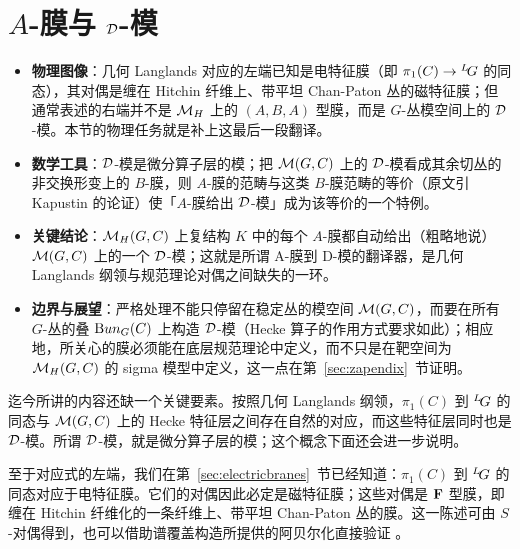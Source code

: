 
\section{$A$-膜与 ${\cal D}$-模}
\label{sec:abranes}

\begin{keytakeaways}
  \begin{itemize}[leftmargin=1.4em,itemsep=2pt,topsep=2pt]
    \item \textbf{物理图像}：几何 Langlands 对应的左端已知是电特征膜（即 $\pi_1(C)\to{}^L\negthinspace G$ 的同态），其对偶是缠在 Hitchin 纤维上、带平坦 Chan-Paton 丛的磁特征膜；但通常表述的右端并不是 $\MH$ 上的 $(A,B,A)$ 型膜，而是 $G$-丛模空间上的 ${\cal D}$-模。本节的物理任务就是补上这最后一段翻译。
    \item \textbf{数学工具}：${\cal D}$-模是微分算子层的模；把 $\M(G,C)$ 上的 ${\cal D}$-模看成其余切丛的非交换形变上的 $B$-膜，则 $A$-膜的范畴与这类 $B$-膜范畴的等价（原文引 Kapustin 的论证）使「$A$-膜给出 ${\cal D}$-模」成为该等价的一个特例。
    \item \textbf{关键结论}：$\MH(G,C)$ 上复结构 $K$ 中的每个 $A$-膜都自动给出（粗略地说）$\M(G,C)$ 上的一个 ${\cal D}$-模；这就是所谓 A-膜到 D-模的翻译器，是几何 Langlands 纲领与规范理论对偶之间缺失的一环。
    \item \textbf{边界与展望}：严格处理不能只停留在稳定丛的模空间 $\M(G,C)$，而要在所有 $G$-丛的叠 ${\rm Bun}_G(C)$ 上构造 ${\cal D}$-模（Hecke 算子的作用方式要求如此）；相应地，所关心的膜必须能在底层规范理论中定义，而不只是在靶空间为 $\MH(G,C)$ 的 sigma 模型中定义，这一点在第~\ref{sec:zapendix}~节证明。
  \end{itemize}
\end{keytakeaways}


迄今所讲的内容还缺一个关键要素。按照几何 Langlands 纲领，$\pi_1(C)$ 到 $^L\negthinspace G$ 的同态与 ${\EUM}(G,C)$ 上的 Hecke 特征层之间存在自然的对应，而这些特征层同时也是 ${\cal D}$-模。所谓 ${\cal D}$-模，就是微分算子层的模；这个概念下面还会进一步说明。

至于对应式的左端，我们在第~\ref{sec:electricbranes}~节已经知道：$\pi_1(C)$ 到 $^L\negthinspace G$ 的同态对应于电特征膜。它们的对偶因此必定是磁特征膜；这些对偶是 ${\CMF}$ 型膜，即缠在 Hitchin 纤维化的一条纤维上、带平坦 Chan-Paton 丛的膜。这一陈述可由 $S$-对偶得到，也可以借助谱覆盖构造所提供的阿贝尔化直接验证 \cite{ref26}。

